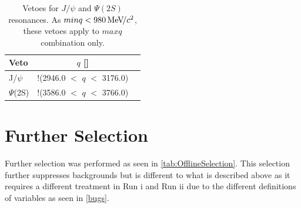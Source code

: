 \begin{table}[h!]
\begin{center}
\begin{tabular}{l c c}
	Veto & $q$ [\mevcc]  \\ \hline
        J/$\psi$  & !(2946.0 $<$ $q$ $<$ 3176.0)  \\
	$\Psi$(2S) &  !(3586.0 $<$ $q$  $<$ 3766.0)  \\
        \hline
\end{tabular}
\end{center}
\caption{Vetoes for $J/\psi$ and $\Psi(2S)$ resonances. As $minq< 980 {\mathrm{\,Me\kern -0.1em V\!/}c^2}$, these vetoes apply to $maxq$ combination only. }
\label{tab:vetoes}
\end{table}

\section{Further Selection}

Further selection was performed as seen in \autoref{tab:OfflineSelection}. This selection further suppresses backgrounds but is different to what is described above as it requires a different treatment in Run \Rn{1} and Run \Rn{2} due to the different definitions of variables as seen in \autoref{bugs}. 

